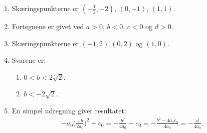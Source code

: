 \begin{enumerate}
	\item Skæringspunkterne er $ (-\frac{1}{2},-2) $, $ (0,-1) $, $ (1,1) $.
	
	\item \label{it:poly2ans} Fortegnene er givet ved $ a>0 $, $b<0$, $c<0$ og $d>0$.
%	
	
	\item \label{it:poly3ans} Skæringspunkterne er $ (-1,2) $,$ (0,2) $ og $ (1,0) $.
%	

	
	\item Svarene er:
	\begin{enumerate}
		\item $ 0< b< 2\sqrt{2}$.
		\item $b<-2\sqrt{2}$.
	\end{enumerate}
	
	\item En simpel udregning giver resultatet:
	\begin{align*}
	-a_0 \Big(\frac{-b}{2a_0} \Big)^2+c_0=-\frac{b^2}{4a_0}+c_0=-\frac{b^2-4a_0c_0}{4a_0}=-\frac{d}{4a_0}.
	\end{align*}
\end{enumerate}